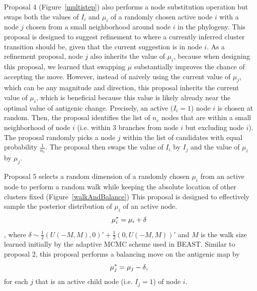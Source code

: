 \documentclass[11pt,oneside,letterpaper]{article}
\begin{document}
Proposal 4 (Figure~\ref{multistep}) also performs a node substitution operation but swaps both the values of $I_i$ and $\mu_i$ of a randomly chosen active node $i$ with a node $j$ chosen from a small neighborhood around node $i$ in the phylogeny. 
This proposal is designed to suggest refinement to where a currently inferred cluster transition should be, given that the current suggestion is in node $i$.
As a refinement proposal, node $j$ also inherits the value of $\mu_i$, because when designing this proposal, we learned that swapping $\mu$ substantially improves the chance of accepting the move.
However, instead of naively using the current value of $\mu_j$, which can be any magnitude and direction, this proposal inherits the current value of  $\mu_i$, which is beneficial because this value is likely already near the optimal value of antigenic change.
Precisely, an active ($I_i=1$) node $i$ is chosen at random.
Then, the proposal identifies the list of $n_{c}$ nodes that are within a small neighborhood of node $i$ (i.e.  within 3 branches from node $i$ but excluding node $i$).
The proposal randomly picks a node $j$ within the list of candidates with equal probability $\frac{1}{n_{c}}$.
The proposal then swaps the value of $I_i$ by $I_j$ and the value of $\mu_i$ by $\mu_j$.



Proposal 5 selects a random dimension of a randomly chosen $\mu_i$ from an active node to perform a random walk while keeping the absolute location of other clusters fixed (Figure~\ref{walkAndBalance})
This proposal is designed to effectively sample the posterior distribution of $\mu_i$ of an active node. 
\begin{equation}
	\mu_i^{*} =  \mu_i + \delta \\
\end{equation},
where $\delta \sim \frac{1}{2} (U(-M, M), 0)' + \frac{1}{2} (0, U(-M, M))'$ and $M$ is the walk size learned initially by the adaptive MCMC scheme used in BEAST.
Similar to proposal 2, this proposal performs a balancing move on the antigenic map by
\begin{equation}
	\mu_j^{*} =  \mu_j - \delta\\     ,
\label{balance_mu}
\end{equation}
for each $j$ that is an active child node (i.e. $I_j = 1$) of node $i$.
\end{document}
